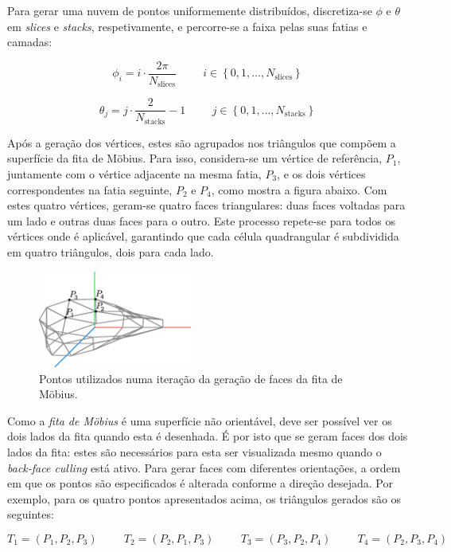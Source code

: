 \documentclass[12pt, a4paper]{article}
\begin{document}
Para gerar uma nuvem de pontos uniformemente distribuídos, discretiza-se $\phi$ e $\theta$ em
\emph{slices} e \emph{stacks}, respetivamente, e percorre-se a faixa pelas suas fatias e camadas:

$$
\phi_i = i \cdot \frac{2\pi}{N_\text{slices}}
\hspace{1cm}
i \in \left \lbrace 0, 1, \ldots, N_\text{slices} \right \rbrace
$$

$$
\theta_j = j \cdot \frac{2}{N_\text{stacks}} -1
\hspace{1cm}
j \in \left \lbrace 0, 1, \ldots, N_\text{stacks} \right \rbrace
$$

Após a geração dos vértices, estes são agrupados nos triângulos que compõem a superfície da
fita de Möbius. Para isso, considera-se um vértice de referência, $P_1$, juntamente com o vértice
adjacente na mesma fatia, $P_3$, e os dois vértices correspondentes na fatia seguinte, $P_2$ e
$P_4$, como mostra a figura abaixo. Com estes quatro vértices, geram-se quatro faces triangulares:
duas faces voltadas para um lado e outras duas faces para o outro. Este processo repete-se para
todos os vértices onde é aplicável, garantindo que cada célula quadrangular é subdividida em
quatro triângulos, dois para cada lado.

\begin{figure}[H]
    \centering
    \includegraphics[width=0.45\textwidth]{res/phase2/figures/MobiusStrip.pdf}
    \caption{Pontos utilizados numa iteração da geração de faces da fita de Möbius.}
\end{figure}

Como a \emph{fita de Möbius} é uma superfície não orientável, deve ser possível ver os dois lados da
fita quando esta é desenhada. É por isto que se geram faces dos dois lados da fita: estes são
necessários para esta ser visualizada mesmo quando o \emph{back-face culling} está ativo. Para gerar
faces com diferentes orientações, a ordem em que os pontos são especificados é alterada conforme a
direção desejada. Por exemplo, para os quatro pontos apresentados acima, os triângulos gerados são
os seguintes:

$$
T_1 = (P_1, P_2, P_3)
\hspace{1cm}
T_2 = (P_2, P_1, P_3)
\hspace{1cm}
T_3 = (P_3, P_2, P_4)
\hspace{1cm}
T_4 = (P_2, P_3, P_4)
$$
\end{document}
